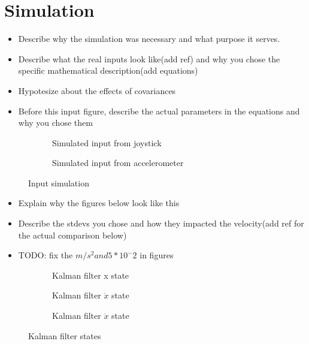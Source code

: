 \section{Simulation}\label{sec:sim}

\begin{itemize}
 \item Describe why the simulation was necessary and what purpose it serves.
 \item Describe what the real inputs look like(add ref) and why you chose the specific mathematical description(add equations)
 \item Hypotesize about the effects of covariances
\end{itemize}
\hrulefill
\begin{itemize}
 \item Before this input figure, describe the actual parameters in the equations and why you chose them
\end{itemize}

\begin{figure}[h]
 \begin{subfigure}[b]{0.45\textwidth}
  \label{InputVelSim}
  \caption{Simulated input from joystick}
 \end{subfigure}
 \hfill
 \begin{subfigure}[b]{0.45\textwidth}
  \label{InputAccelSim}
  \caption{Simulated input from accelerometer}
 \end{subfigure}
 \caption{Input simulation}
\end{figure}

\begin{itemize}
 \item Explain why the figures below look like this
 \item Describe the stdevs you chose and how they impacted the velocity(add ref for the actual comparison below)
 \item TODO: fix the $m/s^2 and 5*10^-2$ in figures
\end{itemize}

\begin{figure}[H]
 \flushleft
 \begin{subfigure}[c]{0.8\textwidth}
  \label{RobotDistSim}
  \caption{Kalman filter x state}
 \end{subfigure}
 \hfill
 \begin{subfigure}[c]{0.8\textwidth}
  \label{RobotVelSim}
  \caption{Kalman filter $\dot{x}$ state}
 \end{subfigure}
 \hfill
 \begin{subfigure}[c]{0.8\textwidth}
  \label{RobotAccelSim}
  \caption{Kalman filter $\ddot{x}$ state}
 \end{subfigure}
 \caption{Kalman filter states}
\end{figure}

